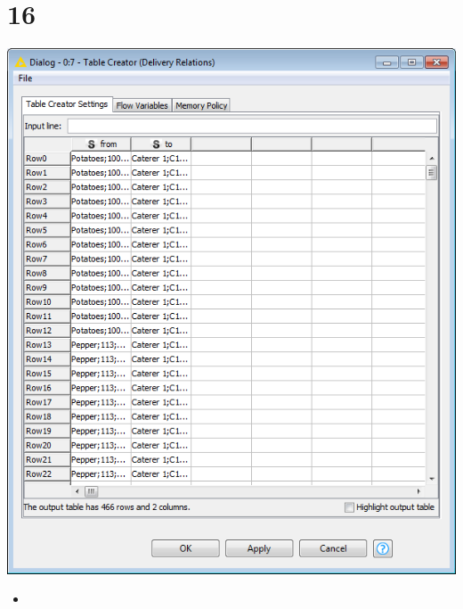 \documentclass{beamer}
\begin{document}
\section{16}
\begin{frame}
	\begin{center}
  		\includegraphics[height=0.6\textheight]{16.png}
	\end{center}
	\begin{itemize}
		\item
	\end{itemize}
\end{frame}
\end{document}
